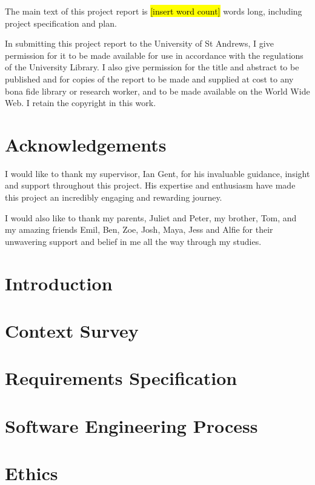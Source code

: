 \documentclass[12pt]{report}
\newcommand{\hlc}[2][yellow]{{%
    \colorlet{foo}{#1}%
    \sethlcolor{foo}\hl{#2}}%
}
\begin{document}
The main text of this project report is \hlc[yellow]{[insert word count]} words long, including project specification and plan.

In submitting this project report to the University of St Andrews, I give permission for it to be made available for use in accordance with the regulations of the University Library. I also give permission for the title and abstract to be published and for copies of the report to be made and supplied at cost to any bona fide library or research worker, and to be made available on the World Wide Web. I retain the copyright in this work.

\chapter*{Acknowledgements}
I would like to thank my supervisor, Ian Gent, for his invaluable guidance, insight and support throughout this project. His expertise and enthusiasm have made this project an incredibly engaging and rewarding journey.

I would also like to thank my parents, Juliet and Peter, my brother, Tom, and my amazing friends Emil, Ben, Zoe, Josh, Maya, Jess and Alfie for their unwavering support and belief in me all the way through my studies.

\tableofcontents

\chapter{Introduction}


\chapter{Context Survey}


\chapter{Requirements Specification}


\chapter{Software Engineering Process}


\chapter{Ethics}

\end{document}
